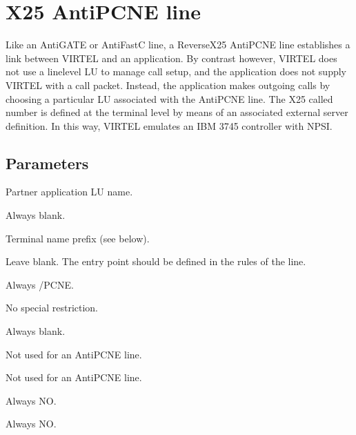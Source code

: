 \documentclass[letterpaper,10pt,english]{sphinxmanual}
\begin{document}
\section{X25 AntiPCNE line}
\label{\detokenize{connectivity_guide:x25-antipcne-line}}\label{\detokenize{connectivity_guide:index-82}}
\sphinxAtStartPar
Like an AntiGATE or AntiFastC line, a Reverse\sphinxhyphen{}X25 AntiPCNE line establishes a link between VIRTEL and an application. By contrast however, VIRTEL does not use a line\sphinxhyphen{}level LU to manage call setup, and the application does not supply VIRTEL with a call packet. Instead, the application makes outgoing calls by choosing a particular LU associated with the AntiPCNE line. The X25 called number is defined at the terminal level by means of an associated external server definition. In this way, VIRTEL emulates an IBM 3745 controller with NPSI.

\sphinxAtStartPar
{}

\ignorespaces 

\subsection{Parameters}
\label{\detokenize{connectivity_guide:index-83}}\label{\detokenize{connectivity_guide:id40}}\begin{description}
\sphinxAtStartPar
Partner application LU name.

\sphinxAtStartPar
Always blank.

\sphinxAtStartPar
Terminal name prefix (see below).

\sphinxAtStartPar
Leave blank. The entry point should be defined in the rules of the line.

\sphinxAtStartPar
Always /PCNE.

\sphinxAtStartPar
No special restriction.

\sphinxAtStartPar
Always blank.

\sphinxAtStartPar
Not used for an AntiPCNE line.

\sphinxAtStartPar
Not used for an AntiPCNE line.

\sphinxAtStartPar
Always NO.

\sphinxAtStartPar
Always NO.

\end{description}
\end{document}
